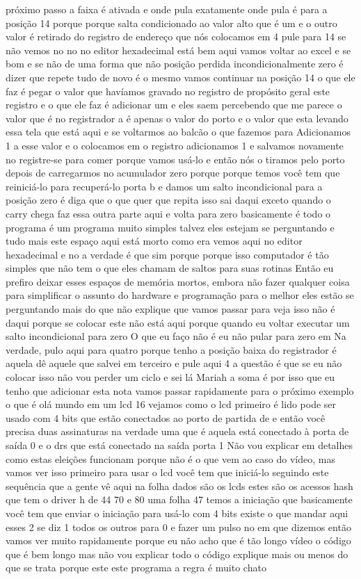\documentclass[oneside,11pt]{memoir} %
\begin{document}
próximo passo a faixa é ativada e  onde pula exatamente onde pula é  para a posição 14 porque porque salta  condicionado ao valor alto que é um e  o outro valor é retirado do registro de  endereço que nós colocamos em 4  pule para 14 se não vemos no no no  editor hexadecimal está bem aqui  vamos voltar ao excel  e se bom e se não de uma forma que não  posição perdida incondicionalmente  zero é dizer que repete tudo de novo  é o mesmo  vamos continuar  na posição 14 o que ele faz é pegar  o valor que havíamos gravado no  registro de propósito geral este registro  e o que ele faz é adicionar um e eles saem  percebendo que me parece o valor que é  no registrador a é apenas o valor  do porto e o valor que esta levando  essa tela que está aqui  e se voltarmos ao balcão o que fazemos para  Adicionamos 1 a esse valor e o colocamos em  o registro  adicionamos 1 e salvamos novamente no  registre-se para comer porque vamos usá-lo e  então nós o tiramos pelo porto  depois de carregarmos no  acumulador zero porque porque temos  você tem que reiniciá-lo para recuperá-lo  porta b e damos um salto  incondicional para a posição zero é  diga que o que quer que repita isso  sai daqui exceto quando o carry chega  faz essa outra parte aqui e volta para  zero basicamente é todo o programa  é um programa muito simples  talvez eles estejam se perguntando e tudo mais  este espaço aqui está morto como era  vemos aqui no editor hexadecimal e no  a verdade é que sim porque porque isso  computador é tão simples que não tem  o que eles chamam de saltos para suas rotinas  Então eu prefiro deixar esses  espaços de memória mortos, embora não  fazer qualquer coisa para simplificar o assunto do  hardware e programação para o melhor  eles estão se perguntando mais do que  não explique que vamos passar para  veja isso não é daqui porque se colocar  este não está aqui porque quando eu voltar  executar um salto incondicional para zero  O que eu faço não é eu não pular para zero em  Na verdade, pulo aqui para quatro porque tenho  a posição baixa do registrador é aquela  dê aquele que salvei em terceiro e pule  aqui 4 a questão é que se eu não colocar isso  não vou perder um ciclo e sei lá  Mariah a soma é por isso que eu tenho que adicionar  esta nota  vamos passar rapidamente para o próximo  exemplo o que é olá mundo em um lcd  16 vejamos como o  lcd primeiro é lido pode ser usado  com 4 bits que estão conectados ao  porto de partida de e então você precisa  duas assinaturas na verdade uma que é aquela  está conectado à porta de saída 0  e o drs que está conectado na saída  porta 1  Não vou explicar em detalhes como  estas eleições funcionam porque não é  o que vem ao caso do vídeo, mas  vamos ver isso primeiro para usar o  lcd você tem que iniciá-lo seguindo este  sequência que a gente vê aqui na folha  dados são os lcds estes são os acessos  hash que tem o driver h de 44  70 e 80  uma folha 47 temos a iniciação que  basicamente você tem que enviar o  iniciação para usá-lo com 4 bits existe  o que mandar aqui esses 2  se diz  1 todos os outros para 0 e fazer um pulso  no  em que dizemos  então vamos ver muito rapidamente  porque eu não acho que é tão longo  vídeo o código que é bem longo  mas não vou explicar todo o código  explique mais ou menos do que se trata  porque este este programa a regra é  muito chato 
\end{document}
